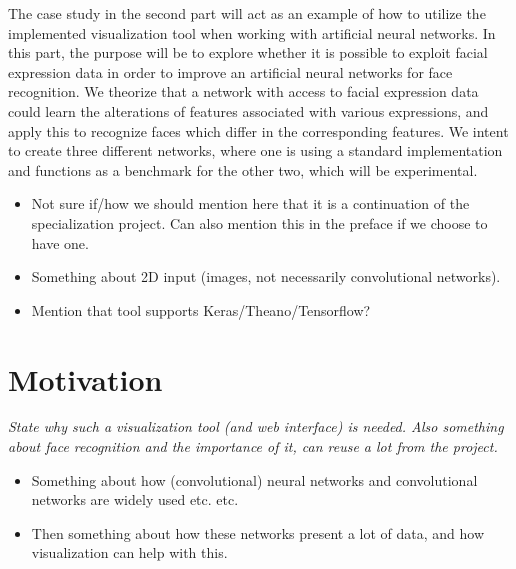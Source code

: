 \noindent The case study in the second part will act as an example of how to utilize the implemented visualization tool when working with artificial neural networks. In this part, the purpose will be to explore whether it is possible to exploit facial expression data in order to improve an artificial neural networks for face recognition. We theorize that a network with access to facial expression data could learn the alterations of features associated with various expressions, and apply this to recognize faces which differ in the corresponding features. We intent to create three different networks, where one is using a standard implementation and functions as a benchmark for the other two, which will be experimental.

\begin{itemize}
    \item Not sure if/how we should mention here that it is a continuation of the specialization project. Can also mention this in the preface if we choose to have one.
    \item Something about 2D input (images, not necessarily convolutional networks).
    \item Mention that tool supports Keras/Theano/Tensorflow?
\end{itemize}

\section{Motivation}

\textit{State why such a visualization tool (and web interface) is needed. Also something about face recognition and the importance of it, can reuse a lot from the project.}

\begin{itemize}
    \item Something about how (convolutional) neural networks and convolutional networks are widely used etc. etc.
    \item Then something about how these networks present a lot of data, and how visualization can help with this.
\end{itemize}

